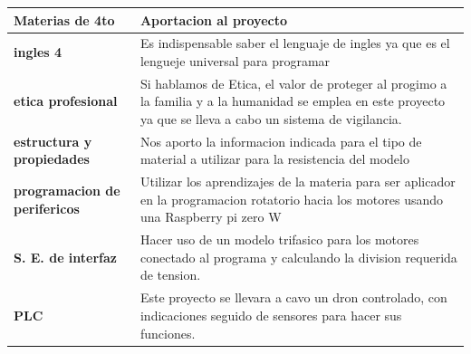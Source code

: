 \documentclass[11pt,a4paper]{article}
\begin{document}
\begin{tabular}{|p{5.5cm}|p{7cm}|}
\hline 
\textbf{Materias de 4to} & \textbf{Aportacion al proyecto} \\ \hline
\textbf{ingles 4} & Es indispensable saber el lenguaje de  ingles ya que es el lengueje universal para programar \\ \hline
\textbf{etica profesional} & Si hablamos de Etica, el valor de proteger al progimo a la familia y a la humanidad  se emplea en este proyecto ya que se lleva a cabo un sistema de vigilancia. \\ \hline
\textbf{estructura y propiedades} & Nos aporto la informacion indicada para el tipo de material a utilizar para la resistencia  del modelo \\ \hline
\textbf{programacion de perifericos} & Utilizar los aprendizajes de la materia para ser aplicador en la programacion rotatorio hacia los motores usando una Raspberry pi zero W \\ \hline
\textbf{S. E. de interfaz} & Hacer uso de un modelo trifasico para los motores conectado al programa y calculando la division requerida de tension.  \\ \hline
\textbf{PLC} & Este proyecto se llevara a cavo un dron controlado, con indicaciones seguido de sensores para hacer sus funciones. \\ \hline
\end{tabular}
\end{document}
